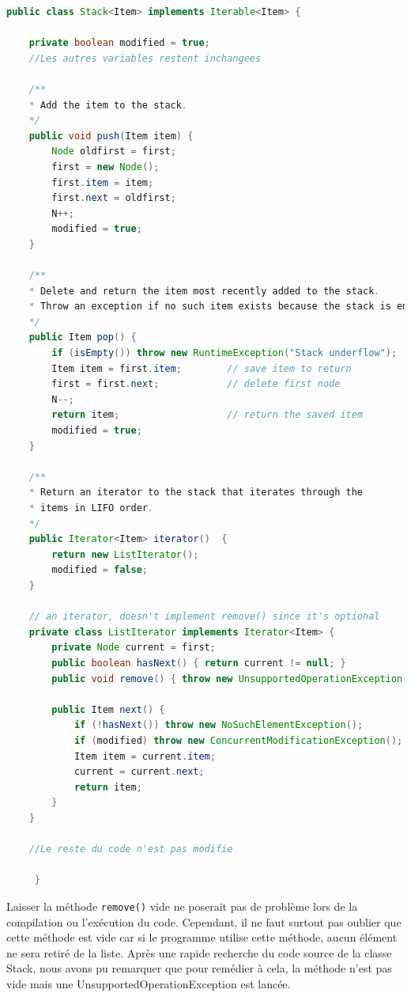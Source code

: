 \begin{enumerate}
	\begin{lstlisting}[language=Java]
public class Stack<Item> implements Iterable<Item> {
	 
    private boolean modified = true;
    //Les autres variables restent inchangees
	 
    /**
    * Add the item to the stack.
    */
    public void push(Item item) {
        Node oldfirst = first;
        first = new Node();
        first.item = item;
        first.next = oldfirst;
        N++;
        modified = true;
    }
	 
    /**
    * Delete and return the item most recently added to the stack.
    * Throw an exception if no such item exists because the stack is empty.
    */
    public Item pop() {
        if (isEmpty()) throw new RuntimeException("Stack underflow");
        Item item = first.item;        // save item to return
        first = first.next;            // delete first node
        N--;
        return item;                   // return the saved item
        modified = true;
    }
    
    /**
    * Return an iterator to the stack that iterates through the 
    * items in LIFO order.
    */
    public Iterator<Item> iterator()  { 
    	return new ListIterator();
    	modified = false;
    }

    // an iterator, doesn't implement remove() since it's optional
    private class ListIterator implements Iterator<Item> {
        private Node current = first;
        public boolean hasNext() { return current != null; }
        public void remove() { throw new UnsupportedOperationException(); }

        public Item next() {
            if (!hasNext()) throw new NoSuchElementException();
            if (modified) throw new ConcurrentModificationException();
            Item item = current.item;
            current = current.next; 
            return item;
        }
    }
    
    //Le reste du code n'est pas modifie
	 
	 }
	 \end{lstlisting}
	 \vspace{0.5cm}
	 
        Laisser la méthode \lstinline{remove()}\lstinline{} vide
        ne poserait pas de problème lors de la compilation ou
        l'exécution du code. Cependant, il ne faut surtout pas
        oublier que cette méthode est vide car si le programme
        utilise cette méthode, aucun élément ne sera retiré de
        la liste. Après une rapide recherche du code source de
        la classe Stack, nous avons pu remarquer que pour remédier
        à cela, la méthode n'est pas vide mais une
        UnsupportedOperationException est lancée.\\
	 

\end{enumerate}
